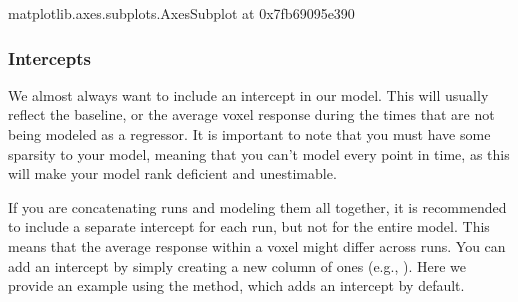 \documentclass[letterpaper,10pt,english]{sphinxmanual}
\begin{document}
\begin{sphinxVerbatim}[commandchars=\\\{\}]
  
\end{sphinxVerbatim}

\begin{sphinxVerbatim}[commandchars=\\\{\}]
\PYG{p}{[}\PYG{p}{]}
\end{sphinxVerbatim}

\begin{sphinxVerbatim}[commandchars=\\\{\}]
\PYGZlt{}matplotlib.axes.\PYGZus{}subplots.AxesSubplot at 0x7fb69095e390\PYGZgt{}
\end{sphinxVerbatim}

\noindent{}

\begin{sphinxVerbatim}[commandchars=\\\{\}]
  
\end{sphinxVerbatim}

\noindent{}


\subsubsection{Intercepts}
\label{\detokenize{content/GLM_Single_Subject_Model:intercepts}}
We almost always want to include an intercept in our model. This will usually reflect the baseline, or the average voxel response during the times that are not being modeled as a regressor. It is important to note that you must have some sparsity to your model, meaning that you can’t model every point in time, as this will make your model rank deficient and unestimable.

If you are concatenating runs and modeling them all together, it is recommended to include a separate intercept for each run, but not for the entire model. This means that the average response within a voxel might differ across runs. You can add an intercept by simply creating a new column of ones (e.g., ). Here we provide an example using the  method, which adds an intercept by default.
\end{document}
